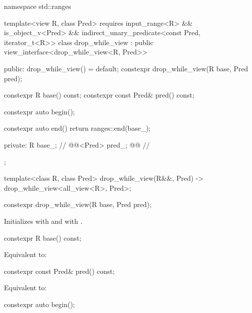 %
\begin{codeblock}
namespace std::ranges {
  template<view R, class Pred>
  requires input_range<R> && is_object_v<Pred> &&
    indirect_unary_predicate<const Pred, iterator_t<R>>
  class drop_while_view : public view_interface<drop_while_view<R, Pred>> {
  public:
    drop_while_view() = default;
    constexpr drop_while_view(R base, Pred pred);

    constexpr R base() const;
    constexpr const Pred& pred() const;

    constexpr auto begin();

    constexpr auto end()
    { return ranges::end(base_); }

  private:
    R base_;                                            // \expos
    @@<Pred> pred_; @\itcorr[-1]@                       // \expos
  };

  template<class R, class Pred>
    drop_while_view(R&&, Pred) -> drop_while_view<all_view<R>, Pred>;
}
\end{codeblock}

%
\begin{itemdecl}
constexpr drop_while_view(R base, Pred pred);
\end{itemdecl}

\begin{itemdescr}
\pnum
\effects
Initializes  with  and
 with .
\end{itemdescr}

%
\begin{itemdecl}
constexpr R base() const;
\end{itemdecl}

\begin{itemdescr}
\pnum
\effects
Equivalent to: 
\end{itemdescr}

%
\begin{itemdecl}
constexpr const Pred& pred() const;
\end{itemdecl}

\begin{itemdescr}
\pnum
\effects
Equivalent to: 
\end{itemdescr}

%
\begin{itemdecl}
constexpr auto begin();
\end{itemdecl}

